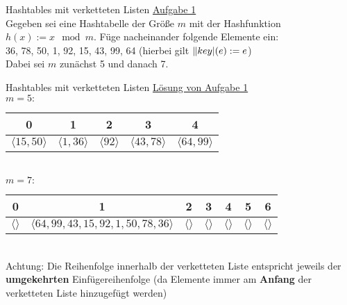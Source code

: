 \begin{frame}{Hashtables mit verketteten Listen}
	\underline{Aufgabe 1} \\
	Gegeben sei eine Hashtabelle der Größe $m$ mit der Hashfunktion $h(x) := x \mod m$. Füge nacheinander folgende Elemente ein: \\ 
	36, 78, 50, 1, 92, 15, 43, 99, 64 \quad  (hierbei gilt $\|key|(e) := e$) \\
	Dabei sei $m$ zunächst 5 und danach 7.
\end{frame}

\begin{frame}{Hashtables mit verketteten Listen}
	\underline{Lösung von Aufgabe 1} \\[0,64cm]
	$m = 5:$
	\begin{tabular}{ | c | c | c | c | c | }
		\hline
		0 & 1 & 2 & 3 & 4
		\\ \hline
		$\langle 15, 50 \rangle$ & $\langle 1,36 \rangle$ & $\langle 92 \rangle$ & $\langle 43,78 \rangle$ & $\langle 64,99 \rangle$
		\\ \hline
	\end{tabular}
	\\[0,64cm]
	$m = 7:$
	\begin{tabular}{ | c | c | c | c | c | c | c |}
		\hline
		0 & 1 & 2 & 3 & 4 & 5 & 6
		\\ \hline
		$\langle  \rangle$ & $\langle 64, 99, 43, 15, 92, 1, 50, 78, 36 \rangle$ & $\langle  \rangle$ & $\langle  \rangle$ & $\langle  \rangle$ & $\langle  \rangle$ & $\langle  \rangle$
		\\ \hline
	\end{tabular}
	\\[0,5cm]
	Achtung: Die Reihenfolge innerhalb der verketteten Liste entspricht jeweils der \textbf{umgekehrten} Einfügereihenfolge (da Elemente immer am \textbf{Anfang} der verketteten Liste hinzugefügt werden) 
\end{frame}


